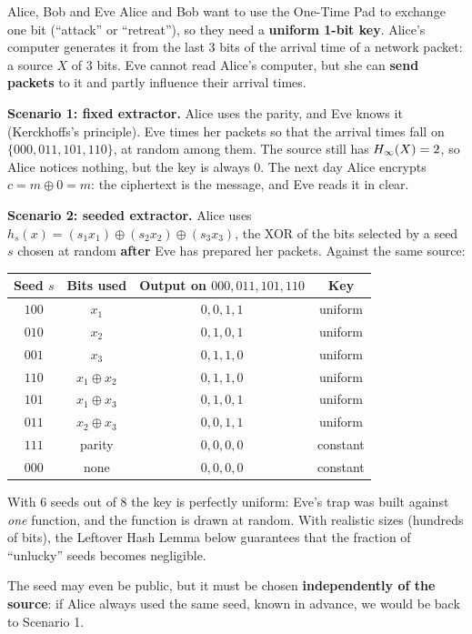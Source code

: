 \begin{framedex}{Alice, Bob and Eve}
  Alice and Bob want to use the One-Time Pad to exchange one bit (``attack'' or ``retreat''), so they need a \textbf{uniform 1-bit key}. Alice's computer generates it from the last $3$ bits of the arrival time of a network packet: a source $X$ of $3$ bits. Eve cannot read Alice's computer, but she can \textbf{send packets} to it and partly influence their arrival times.

  \textbf{Scenario 1: fixed extractor.} Alice uses the parity, and Eve knows it (Kerckhoffs's principle). Eve times her packets so that the arrival times fall on $\{000, 011, 101, 110\}$, at random among them. The source still has $H_\infty(X) = 2$, so Alice notices nothing, but the key is always $0$. The next day Alice encrypts $c = m \oplus 0 = m$: the ciphertext is the message, and Eve reads it in clear.

  \textbf{Scenario 2: seeded extractor.} Alice uses $h_s(x) = (s_1 x_1) \oplus (s_2 x_2) \oplus (s_3 x_3)$, the XOR of the bits selected by a seed $s$ chosen at random \textbf{after} Eve has prepared her packets. Against the same source:
  \begin{center}
    \small
    \begin{tabular}{cccc}
      \toprule
      \textbf{Seed $s$} & \textbf{Bits used} & \textbf{Output on $000, 011, 101, 110$} & \textbf{Key} \\
      \midrule
      $100$ & $x_1$ & $0,0,1,1$ & uniform \\
      $010$ & $x_2$ & $0,1,0,1$ & uniform \\
      $001$ & $x_3$ & $0,1,1,0$ & uniform \\
      $110$ & $x_1 \oplus x_2$ & $0,1,1,0$ & uniform \\
      $101$ & $x_1 \oplus x_3$ & $0,1,0,1$ & uniform \\
      $011$ & $x_2 \oplus x_3$ & $0,0,1,1$ & uniform \\
      $111$ & parity & $0,0,0,0$ & constant \\
      $000$ & none & $0,0,0,0$ & constant \\
      \bottomrule
    \end{tabular}
  \end{center}
  With $6$ seeds out of $8$ the key is perfectly uniform: Eve's trap was built against \textit{one} function, and the function is drawn at random. With realistic sizes (hundreds of bits), the Leftover Hash Lemma below guarantees that the fraction of ``unlucky'' seeds becomes negligible.

  The seed may even be public, but it must be chosen \textbf{independently of the source}: if Alice always used the same seed, known in advance, we would be back to Scenario 1.
\end{framedex}

